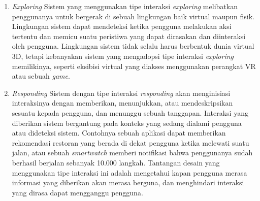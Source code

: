 \begin{enumerate}
  \item \textit{Exploring}
  \subitem Sistem yang menggunakan tipe interaksi \textit{exploring} melibatkan penggunanya untuk bergerak di sebuah lingkungan baik virtual maupun fisik. Lingkungan sistem dapat mendeteksi ketika pengguna melakukan aksi tertentu dan memicu suatu peristiwa yang dapat dirasakan dan diinteraksi oleh pengguna. Lingkungan sistem tidak selalu harus berbentuk dunia virtual 3D, tetapi kebanyakan sistem yang mengadopsi tipe interaksi \textit{exploring} memilikinya, seperti eksibisi virtual yang diakses menggunakan perangkat VR atau sebuah \textit{game}.
  
  \item \textit{Responding}
  \subitem Sistem dengan tipe interaksi \textit{responding} akan menginisiasi interaksinya dengan memberikan, menunjukkan, atau mendeskripsikan sesuatu kepada pengguna, dan menunggu sebuah tanggapan. Interaksi yang diberikan sistem bergantung pada konteks yang sedang dialami pengguna atau dideteksi sistem.  Contohnya sebuah aplikasi dapat memberikan rekomendasi restoran yang berada di dekat pengguna ketika melewati suatu jalan, atau sebuah \textit{smartwatch} memberi notifikasi bahwa penggunanya sudah berhasil berjalan sebanyak 10.000 langkah. Tantangan desain yang menggunakan tipe interaksi ini adalah mengetahui kapan pengguna merasa informasi yang diberikan akan merasa berguna, dan menghindari interaksi yang dirasa dapat mengganggu pengguna.

\end{enumerate}
